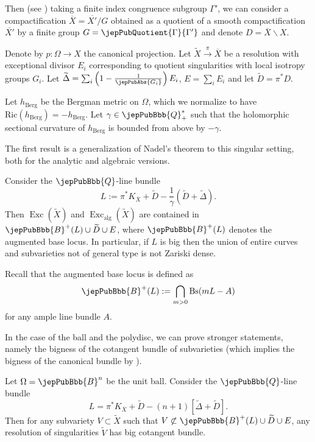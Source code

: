 Then (see \cite{pubref01}) taking a finite index congruence subgroup $\Gamma'$, we can consider a compactification $\overline{X}=\overline{X'}/G$ obtained as a quotient of a smooth compactification $\overline{X'}$ by a finite group $G = \jepPubQuotient{\Gamma}{\Gamma'}$ and denote $D = \overline{X} \smallsetminus X$.

Denote by $p : \Omega \longrightarrow X$ the canonical projection. Let $\widetilde{X} \overset{\pi}{\longrightarrow} \overline{X}$ be a resolution with exceptional divisor $E_i$ corresponding to quotient singularities with local isotropy groups $G_i$. Let $\widetilde{\Delta} = \sum_i \left(1 - \frac{1}{\jepPubAbs{G_i}} \right) E_i$, $E = \sum_i E_i$ and let $\widetilde{D} = \pi^\ast D$.

Let $h_{\mathrm{Berg}}$ be the Bergman metric on $\Omega$, which we normalize to have $\mathrm{Ric}(h_{\mathrm{Berg}}) = -h_{\mathrm{Berg}}$. Let $\gamma \in \jepPubBbb{Q}_+^\ast$ such that the holomorphic sectional curvature of $h_{\mathrm{Berg}}$ is bounded from above by $- \gamma$.

The first result is a generalization of Nadel's theorem \cite{pubref24} to this singular setting, both for the analytic and algebraic versions.

\begin{thma}\label{published:02} Consider the $\jepPubBbb{Q}$-line bundle
$$
L := \pi^\ast K_{\overline{X}} + \widetilde{D}  - \frac{1}{\gamma} \left( \widetilde{D} + \widetilde{\Delta} \right).
$$
Then $\operatorname{Exc}(\widetilde{X})$ and $\operatorname{Exc}_{\text{alg}}(\widetilde{X})$ are contained in $\jepPubBbb{B}^+(L) \cup \widetilde{D} \cup E$, where $\jepPubBbb{B}^+(L)$ denotes the augmented base locus.
In particular, if $L$ is big then the union of entire curves and subvarieties not of general type is not Zariski dense.
\end{thma}


Recall that the augmented base locus is defined as $$\jepPubBbb{B}^+(L):=\bigcap_{m>0} \operatorname{Bs}(mL-A)$$ for any ample line bundle $A$.

In the case of the ball and the polydisc, we can prove stronger statements, namely the bigness of the cotangent bundle of subvarieties (which implies the bigness of the canonical bundle by \cite{pubref09}).

\begin{thmb} \label{published:03} Let $\Omega = \jepPubBbb{B}^n$ be the unit ball. Consider the $\jepPubBbb{Q}$-line bundle 
$$
L = \pi^\ast K_{\overline{X}} + \widetilde{D} - (n+1) \left [\widetilde{\Delta} + \widetilde{D} \right].
$$ Then for any subvariety $V \subset \widetilde{X}$ such that $V \not\subset \jepPubBbb{B}^+ (L) \cup \widetilde{D} \cup E$, any resolution of singularities $\widetilde{V}$ has big cotangent bundle.
\end{thmb}

